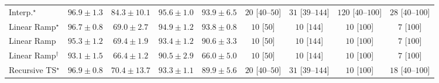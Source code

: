 \begin{tabular}{l|cccc|cccc|}
Interp.$^\star$ & {\cellcolor[HTML]{702806}} \color[HTML]{F1F1F1} $96.9\pm 1.3$ & {\cellcolor[HTML]{D85A09}} \color[HTML]{F1F1F1} $84.3\pm 10.1$ & {\cellcolor[HTML]{7B2B05}} \color[HTML]{F1F1F1} $95.6\pm 1.0$ & {\cellcolor[HTML]{892F05}} \color[HTML]{F1F1F1} $93.9\pm 6.5$ & {\cellcolor[HTML]{FFF4F0}} \color[HTML]{000000} $20$ [$40$--$50$] & {\cellcolor[HTML]{FFF2EE}} \color[HTML]{000000} $31$ [$39$--$144$] & {\cellcolor[HTML]{FDDCD8}} \color[HTML]{000000} $120$ [$40$--$100$] & {\cellcolor[HTML]{FFF3EF}} \color[HTML]{000000} $28$ [$40$--$100$] \\
Linear Ramp$^\star$ & {\cellcolor[HTML]{712806}} \color[HTML]{F1F1F1} $96.7\pm 0.8$ & {\cellcolor[HTML]{FEC652}} \color[HTML]{000000} $69.0\pm 2.7$ & {\cellcolor[HTML]{812D05}} \color[HTML]{F1F1F1} $94.9\pm 1.2$ & {\cellcolor[HTML]{8B3005}} \color[HTML]{F1F1F1} $93.8\pm 0.8$ & {\cellcolor[HTML]{FFF7F3}} \color[HTML]{000000} $10$ [$50$] & {\cellcolor[HTML]{FFF7F3}} \color[HTML]{000000} $10$ [$144$] & {\cellcolor[HTML]{FFF7F3}} \color[HTML]{000000} $10$ [$100$] & {\cellcolor[HTML]{FFF7F3}} \color[HTML]{000000} $7$ [$100$] \\
Linear Ramp & {\cellcolor[HTML]{7C2C05}} \color[HTML]{F1F1F1} $95.3\pm 1.2$ & {\cellcolor[HTML]{FEC24D}} \color[HTML]{000000} $69.4\pm 1.9$ & {\cellcolor[HTML]{8E3104}} \color[HTML]{F1F1F1} $93.4\pm 1.2$ & {\cellcolor[HTML]{A83B03}} \color[HTML]{F1F1F1} $90.6\pm 3.3$ & {\cellcolor[HTML]{FFF7F3}} \color[HTML]{000000} $10$ [$50$] & {\cellcolor[HTML]{FFF7F3}} \color[HTML]{000000} $10$ [$144$] & {\cellcolor[HTML]{FFF7F3}} \color[HTML]{000000} $10$ [$100$] & {\cellcolor[HTML]{FFF7F3}} \color[HTML]{000000} $7$ [$100$] \\
Linear Ramp$^\dagger$ & {\cellcolor[HTML]{913204}} \color[HTML]{F1F1F1} $93.1\pm 1.5$ & {\cellcolor[HTML]{FED36F}} \color[HTML]{000000} $66.4\pm 1.2$ & {\cellcolor[HTML]{A83B03}} \color[HTML]{F1F1F1} $90.5\pm 2.9$ & {\cellcolor[HTML]{FED573}} \color[HTML]{000000} $66.0\pm 5.0$ & {\cellcolor[HTML]{FFF7F3}} \color[HTML]{000000} $10$ [$50$] & {\cellcolor[HTML]{FFF7F3}} \color[HTML]{000000} $10$ [$144$] & {\cellcolor[HTML]{FFF7F3}} \color[HTML]{000000} $10$ [$100$] & {\cellcolor[HTML]{FFF7F3}} \color[HTML]{000000} $7$ [$100$] \\
Recursive TS$^\star$ & {\cellcolor[HTML]{702806}} \color[HTML]{F1F1F1} $96.9\pm 0.8$ & {\cellcolor[HTML]{FEBB47}} \color[HTML]{000000} $70.4\pm 13.7$ & {\cellcolor[HTML]{903104}} \color[HTML]{F1F1F1} $93.3\pm 1.1$ & {\cellcolor[HTML]{AC3D03}} \color[HTML]{F1F1F1} $89.9\pm 5.6$ & {\cellcolor[HTML]{FFF4F0}} \color[HTML]{000000} $20$ [$40$--$50$] & {\cellcolor[HTML]{FFF2EE}} \color[HTML]{000000} $31$ [$39$--$144$] & {\cellcolor[HTML]{FFF7F3}} \color[HTML]{000000} $10$ [$100$] & {\cellcolor[HTML]{FFF5F1}} \color[HTML]{000000} $18$ [$40$--$100$] \\

\end{tabular}
